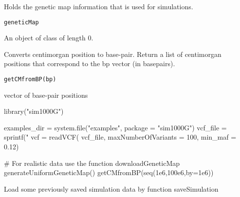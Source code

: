 \documentclass[letterpaper]{book}
\begin{document}
%
\begin{Description}\relax
Holds the genetic map information that is used for simulations.
\end{Description}
%
\begin{Usage}
\begin{verbatim}
geneticMap
\end{verbatim}
\end{Usage}
%
\begin{Format}
An object of class  of length 0.
\end{Format}
%
\begin{Description}\relax
Converts centimorgan position to base-pair. Return a list of centimorgan positions that correspond
to the bp vector (in basepairs).
\end{Description}
%
\begin{Usage}
\begin{verbatim}
getCMfromBP(bp)
\end{verbatim}
\end{Usage}
%
\begin{Arguments}
\begin{ldescription}
\item[\code{bp}] vector of base-pair positions
\end{ldescription}
\end{Arguments}
%
\begin{Examples}
\begin{ExampleCode}

library("sim1000G")

examples_dir = system.file("examples", package = "sim1000G")
vcf_file = sprintf("%
vcf = readVCF( vcf_file, maxNumberOfVariants = 100,
  min_maf = 0.12)

# For realistic data use the function downloadGeneticMap
generateUniformGeneticMap()
getCMfromBP(seq(1e6,100e6,by=1e6))


\end{ExampleCode}
\end{Examples}
%
\begin{Description}\relax
Load some previously saved simulation data by function saveSimulation
\end{Description}
\end{document}

